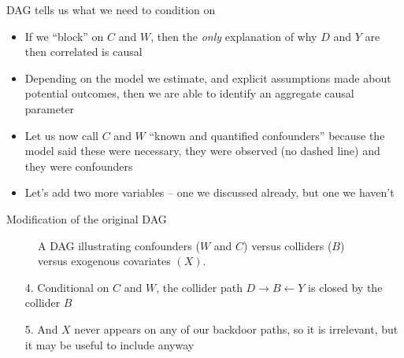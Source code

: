 \documentclass{beamer}
\begin{document}
\begin{frame}{DAG tells us what we need to condition on}

\begin{itemize}

\item If we ``block'' on $C$ and $W$, then the \emph{only} explanation of why $D$ and $Y$ are then correlated is causal
\item Depending on the model we estimate, and explicit assumptions made about potential outcomes, then we are able to identify an aggregate causal parameter
\item Let us now call $C$ and $W$ ``known and quantified confounders'' because the model said these were necessary, they were observed (no dashed line) and they were confounders
\item Let's add two more variables -- one we discussed already, but one we haven't

\end{itemize}

\end{frame}



\begin{frame}{Modification of the original DAG}

\begin{figure}
\begin{center}
\caption{A DAG illustrating confounders ($W$ and $C$) versus colliders ($B$) versus exogenous covariates $(X)$.}
\label{fig:backdoor_dag}
\end{center}
\end{figure}

\begin{enumerate}
\item[4. ] Conditional on $C$ and $W$, the collider path $D \rightarrow B \leftarrow Y$ is closed by the collider $B$
\item[5. ] And $X$ never appears on any of our backdoor paths, so it is irrelevant, but it may be useful to include anyway
\end{enumerate}


\end{frame}
\end{document}
